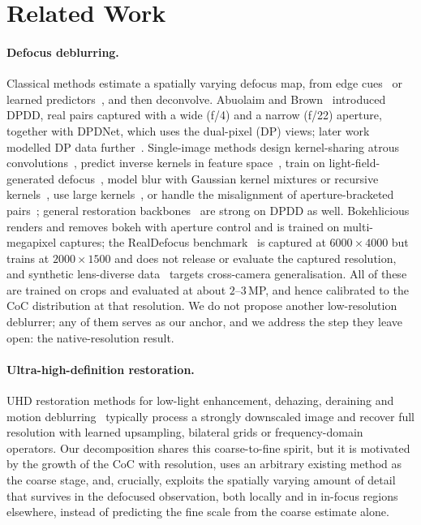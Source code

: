 \section{Related Work}
\label{sec:related}

\paragraph{Defocus deblurring.}
Classical methods estimate a spatially varying defocus map, from edge cues~\cite{zhuo2011defocusmap}
or learned predictors~\cite{lee2019dmenet}, and then deconvolve. Abuolaim and
Brown~\cite{abuolaim2020dpdd} introduced DPDD, real pairs captured with a wide (f/4) and a narrow
(f/22) aperture, together with DPDNet, which uses the dual-pixel (DP) views; later work modelled DP
data further~\cite{abuolaim2021rdpd,xin2021dpdefocus}. Single-image methods design kernel-sharing
atrous convolutions~\cite{son2021kpac}, predict inverse kernels in feature space~\cite{lee2021ifan},
train on light-field-generated defocus~\cite{ruan2022drbnet}, model blur with Gaussian kernel
mixtures or recursive kernels~\cite{quan2021gkmnet,quan2023nrknet}, use large kernels~\cite{ruan2023lakdnet},
or handle the misalignment of aperture-bracketed pairs~\cite{li2023jdrl}; general restoration
backbones~\cite{zamir2022restormer,chen2022nafnet,wang2022uformer} are strong on DPDD as well.
Bokehlicious~\cite{seizinger2025bokehlicious} renders and removes bokeh with aperture control and is
trained on multi-megapixel captures; the RealDefocus benchmark~\cite{seizinger2026realdefocus} is captured at
$6000\times4000$ but trains at $2000\times1500$ and does not release or evaluate the captured resolution, and
synthetic lens-diverse data~\cite{lee2026cldefocus} targets cross-camera generalisation. All of these are trained
on crops and evaluated at about $2$--$3$\,MP,
and hence calibrated to the CoC distribution at that resolution. We do not propose another
low-resolution deblurrer; any of them serves as our anchor, and we address the step they leave
open: the native-resolution result.

\paragraph{Ultra-high-definition restoration.}
UHD restoration methods for low-light enhancement, dehazing, deraining and motion
deblurring~\cite{zheng2021uhdmultiguided,wang2023llformer,wang2024uhdformer,zhang2022mcblur}
typically process a strongly downscaled image and recover full resolution with learned upsampling,
bilateral grids or frequency-domain operators. Our decomposition shares this coarse-to-fine spirit,
but it is motivated by the growth of the CoC with resolution, uses an arbitrary existing method as
the coarse stage, and, crucially, exploits the spatially varying amount of detail that survives in
the defocused observation, both locally and in in-focus regions elsewhere, instead of predicting
the fine scale from the coarse estimate alone.

